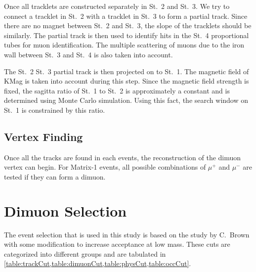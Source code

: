 \documentclass[../main.tex]{subfiles}
\begin{document}
Once all tracklets are constructed separately in St.~2 and St.~3. We try to connect a tracklet
in St.~2 with a tracklet in St.~3 to form a partial track. Since there are no magnet between
St.~2 and St.~3, the slope of the tracklets should be similarly. The partial track is then used to
identify hits in the St.~4 proportional tubes for muon identification. The multiple scattering of
muons due to the iron wall between St.~3 and St.~4 is also taken into account.

The St.~2 St.~3 partial track is then projected on to St.~1. The magnetic field of KMag is taken into
account during this step. Since the magnetic field strength is fixed, the sagitta ratio of St.~1 to
St.~2 is approximately a constant and is determined using Monte Carlo simulation. Using this fact,
the search window on St.~1 is constrained by this ratio.


\subsection{Vertex Finding}
Once all the tracks are found in each events, the reconstruction of the dimuon vertex can begin.
For Matrix-1 events, all possible combinations of $\mu^+$ and $\mu^-$ are tested if they can form
a dimuon.


\section{Dimuon Selection}
The event selection that is used in this study is based on the study by C.~Brown
\cite{chuck-2111} with some modification to increase acceptance at low mass. These cuts
are categorized into different groups and are tabulated in \cref{table:trackCut,table:dimuonCut,table:physCut,table:occCut}.
\end{document}
